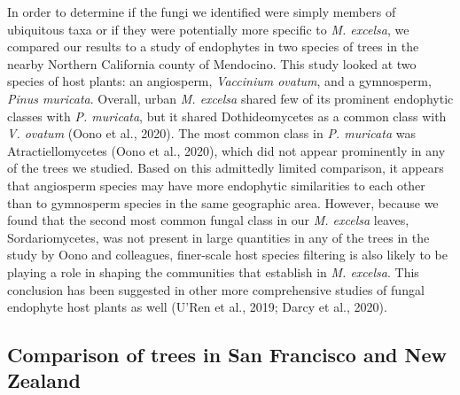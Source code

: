 \documentclass[fleqn,10pt,lineno]{wlpeerj} %
\begin{document}
In order to determine if the fungi we identified were simply members of ubiquitous taxa or if they were potentially more specific to \emph{M. excelsa}, we compared our results to a study of endophytes in two species of trees in the nearby Northern California county of Mendocino. This study looked at two species of host plants: an angiosperm, \emph{Vaccinium ovatum}, and a gymnosperm, \emph{Pinus muricata}. Overall, urban \emph{M. excelsa} shared few of its prominent endophytic classes with \emph{P. muricata}, but it shared Dothideomycetes as a common class with \emph{V. ovatum} (Oono et al., 2020). The most common class in \emph{P. muricata} was Atractiellomycetes (Oono et al., 2020), which did not appear prominently in any of the trees we studied. Based on this admittedly limited comparison, it appears that angiosperm species may have more endophytic similarities to each other than to gymnosperm species in the same geographic area. However, because we found that the second most common fungal class in our \emph{M. excelsa} leaves, Sordariomycetes, was not present in large quantities in any of the trees in the study by Oono and colleagues, finer-scale host species filtering is also likely to be playing a role in shaping the communities that establish in \emph{M. excelsa}. This conclusion has been suggested in other more comprehensive studies of fungal endophyte host plants as well (U'Ren et al., 2019; Darcy et al., 2020).

\hypertarget{comparison-of-trees-in-san-francisco-and-new-zealand}{%
\subsection*{Comparison of trees in San Francisco and New Zealand}\label{comparison-of-trees-in-san-francisco-and-new-zealand}}
\end{document}
